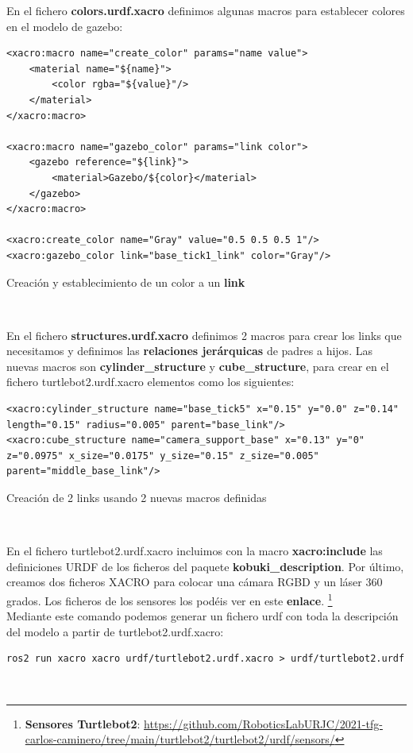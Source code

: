 En el fichero \textbf{colors.urdf.xacro} definimos algunas macros para establecer colores en el modelo de gazebo:\\
\begin{code}[H]
\begin{lstlisting}
<xacro:macro name="create_color" params="name value">
	<material name="${name}">
		<color rgba="${value}"/>
	</material>
</xacro:macro>

<xacro:macro name="gazebo_color" params="link color">
	<gazebo reference="${link}">
		<material>Gazebo/${color}</material>
	</gazebo>
</xacro:macro>

<xacro:create_color name="Gray" value="0.5 0.5 0.5 1"/>
<xacro:gazebo_color link="base_tick1_link" color="Gray"/>
\end{lstlisting}
\caption{Creación y establecimiento de un color a un \textbf{link}}
\label{fig:creacion_color_link}
\end{code}\

En el fichero \textbf{structures.urdf.xacro} definimos 2 macros para crear los links que necesitamos y definimos las \textbf{relaciones jerárquicas} de padres a hijos. Las nuevas macros son \textbf{cylinder\_structure} y \textbf{cube\_structure}, para crear en el fichero turtlebot2.urdf.xacro elementos como los siguientes:
\begin{code}[H]
\begin{lstlisting}
<xacro:cylinder_structure name="base_tick5" x="0.15" y="0.0" z="0.14" length="0.15" radius="0.005" parent="base_link"/>
<xacro:cube_structure name="camera_support_base" x="0.13" y="0" z="0.0975" x_size="0.0175" y_size="0.15" z_size="0.005" parent="middle_base_link"/>
\end{lstlisting}
\caption{Creación de 2 links usando 2 nuevas macros definidas}
\label{fig:creacion_link_macro}
\end{code}\

En el fichero turtlebot2.urdf.xacro incluimos con la macro \textbf{xacro:include} las definiciones URDF de los ficheros del paquete \textbf{kobuki\_description}. Por último, creamos dos ficheros XACRO para colocar una cámara RGBD y un láser 360 grados. Los ficheros de los sensores los podéis ver en este \textbf{enlace}. \footnote{\textbf{Sensores Turtlebot2}: \url{https://github.com/RoboticsLabURJC/2021-tfg-carlos-caminero/tree/main/turtlebot2/turtlebot2/urdf/sensors/}}\\

Mediante este comando podemos generar un fichero urdf con toda la descripción del modelo a partir de turtlebot2.urdf.xacro:\\
\begin{lstlisting}
ros2 run xacro xacro urdf/turtlebot2.urdf.xacro > urdf/turtlebot2.urdf
\end{lstlisting}\




